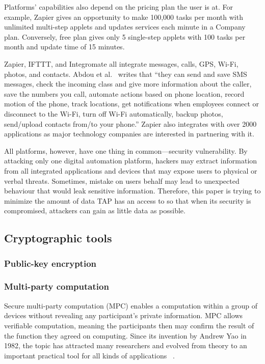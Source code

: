 Platforms' capabilities also depend on the pricing plan the user is at. For
example, Zapier gives an opportunity to make 100,000 tasks per month with
unlimited multi-step applets and updates services each minute in a Company
plan. Conversely, free plan gives only 5 single-step applets with 100 tasks per
month and update time of 15 minutes.

Zapier, IFTTT, and Integromate all integrate messages, calls, GPS, Wi-Fi,
photos, and contacts. Abdou et al.~\cite{DBLP:conf/icict2/AbdouEF21} writes that
``they can send and save SMS messages, check the incoming class and give more
information about the caller, save the numbers you call, automate actions based
on phone location, record motion of the phone, track locations, get
notifications when employees connect or disconnect to the Wi-Fi, turn off Wi-Fi
automatically, backup photos, send/upload contacts from/to your phone.'' Zapier
also integrates with over 2000 applications as major technology companies are
interested in partnering with it.

All platforms, however, have one thing in common---security vulnerability. By
attacking only one digital automation platform, hackers may extract information
from all integrated applications and devices that may expose users to physical
or verbal threats. Sometimes, mistake on users behalf may lead to unexpected
behaviour that would leak sensitive information. Therefore, this paper is trying
to minimize the amount of data TAP has an access to so that when its security is
compromised, attackers can gain as little data as possible.

\subsection{Cryptographic tools}

\subsubsection{Public-key encryption}


\subsubsection{Multi-party computation}

Secure multi-party computation (MPC) enables a computation within a group of
devices without revealing any participant's private information. MPC allows
verifiable computation, meaning the participants then may confirm the result of
the function they agreed on computing. Since its invention by Andrew Yao in
1982, the topic has attracted many researchers and evolved from theory to an
important practical tool for all kinds of applications
~\cite{DBLP:journals/ftsec/EvansKR18}.

